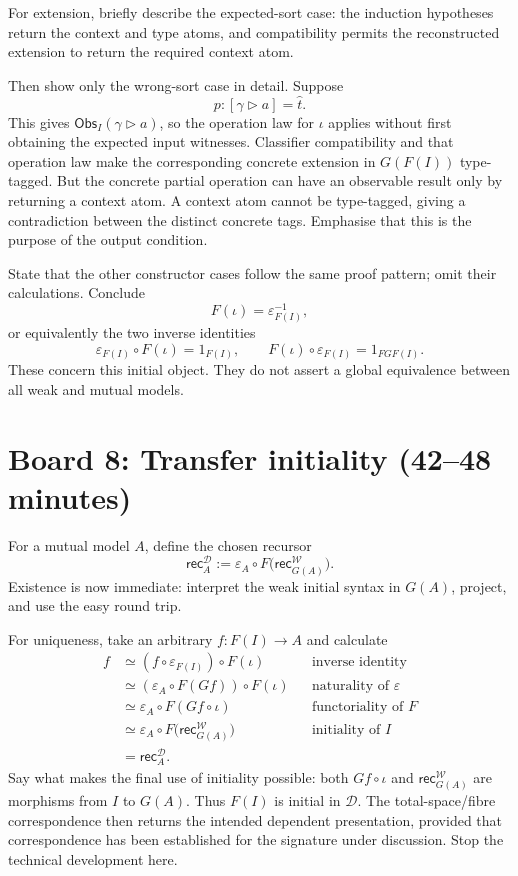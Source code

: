 \documentclass[11pt]{article}
\newcommand{\Obs}{\mathsf{Obs}}
\newcommand{\Weak}{\mathcal{W}}
\newcommand{\Mutual}{\mathcal{D}}
\newcommand{\ext}{\mathbin{\triangleright}}
\newcommand{\ttag}{\widehat t}
\begin{document}
For extension, briefly describe the expected-sort case: the induction
hypotheses return the context and type atoms, and compatibility permits
the reconstructed extension to return the required context atom.

Then show only the wrong-sort case in detail. Suppose
\[
 p:[\gamma\ext a]=\ttag.
\]
This gives \(\Obs_I(\gamma\ext a)\), so the operation law for \(\iota\)
applies without first obtaining the expected input witnesses. Classifier
compatibility and that operation law make the corresponding concrete
extension in \(G(F(I))\) type-tagged. But the concrete partial operation
can have an observable result only by returning a context atom. A context
atom cannot be type-tagged, giving a contradiction between the distinct
concrete tags. Emphasise that this is the purpose of the output condition.

State that the other constructor cases follow the same proof pattern;
omit their calculations. Conclude
\[
 F(\iota)=\varepsilon^{-1}_{F(I)},
\]
or equivalently the two inverse identities
\[
 \varepsilon_{F(I)}\circ F(\iota)=1_{F(I)},
 \qquad F(\iota)\circ\varepsilon_{F(I)}=1_{FGF(I)}.
\]
These concern this initial object. They do not assert a global equivalence
between all weak and mutual models.

\section*{Board 8: Transfer initiality (42--48 minutes)}

For a mutual model \(A\), define the chosen recursor
\[
 \mathsf{rec}^{\Mutual}_A
 :=\varepsilon_A\circ F\bigl(\mathsf{rec}^{\Weak}_{G(A)}\bigr).
\]
Existence is now immediate: interpret the weak initial syntax in \(G(A)\),
project, and use the easy round trip.

For uniqueness, take an arbitrary \(f:F(I)\to A\) and calculate
\[
\begin{aligned}
 f
 &\simeq(f\circ\varepsilon_{F(I)})\circ F(\iota)
       &&\text{inverse identity}\\
 &\simeq(\varepsilon_A\circ F(Gf))\circ F(\iota)
       &&\text{naturality of }\varepsilon\\
 &\simeq\varepsilon_A\circ F(Gf\circ\iota)
       &&\text{functoriality of }F\\
 &\simeq\varepsilon_A\circ F\bigl(\mathsf{rec}^{\Weak}_{G(A)}\bigr)
       &&\text{initiality of }I\\
 &=\mathsf{rec}^{\Mutual}_A.
\end{aligned}
\]
Say what makes the final use of initiality possible: both
\(Gf\circ\iota\) and \(\mathsf{rec}^{\Weak}_{G(A)}\) are morphisms
from \(I\) to \(G(A)\). Thus \(F(I)\) is initial in \(\Mutual\).
The total-space/fibre correspondence then returns the intended dependent
presentation, provided that correspondence has been established for the
signature under discussion. Stop the technical development here.
\end{document}
